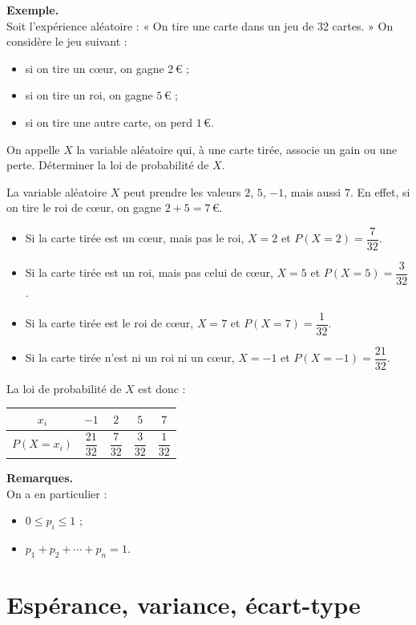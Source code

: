 \documentclass[11pt]{article}
\newenvironment{remarques}{\par\smallskip\noindent\textbf{Remarques. \\}\ignorespaces}{\par\smallskip}
\newenvironment{exemple}{\par\smallskip\noindent\textbf{Exemple. \\}\ignorespaces}{\par\smallskip}
\begin{document}
\begin{exemple}
Soit l'expérience aléatoire : « On tire une carte dans un jeu de 32 cartes. » On considère le jeu suivant :
\begin{itemize}
    \item si on tire un cœur, on gagne $2\,€$ ;
    \item si on tire un roi, on gagne $5\,€$ ;
    \item si on tire une autre carte, on perd $1\,€$.
\end{itemize}
On appelle $X$ la variable aléatoire qui, à une carte tirée, associe un gain ou une perte. Déterminer la loi de probabilité de $X$.

La variable aléatoire $X$ peut prendre les valeurs $2$, $5$, $-1$, mais aussi $7$. En effet, si on tire le roi de cœur, on gagne $2+5=7\,€$.
\begin{itemize}
    \item Si la carte tirée est un cœur, mais pas le roi, $X=2$ et $P(X=2)=\dfrac{7}{32}$.
    \item Si la carte tirée est un roi, mais pas celui de cœur, $X=5$ et $P(X=5)=\dfrac{3}{32}$.
    \item Si la carte tirée est le roi de cœur, $X=7$ et $P(X=7)=\dfrac{1}{32}$.
    \item Si la carte tirée n'est ni un roi ni un cœur, $X=-1$ et $P(X=-1)=\dfrac{21}{32}$.
\end{itemize}
La loi de probabilité de $X$ est donc :
\begin{center}
\renewcommand{\arraystretch}{1.4}
\begin{tabular}{c|cccc}
$x_i$ & $-1$ & $2$ & $5$ & $7$ \\
\hline
$P(X=x_i)$ & $\dfrac{21}{32}$ & $\dfrac{7}{32}$ & $\dfrac{3}{32}$ & $\dfrac{1}{32}$
\end{tabular}
\end{center}
\end{exemple}

\begin{remarques}
On a en particulier :
\begin{itemize}
    \item $0\leq p_i\leq 1$ ;
    \item $p_1+p_2+\cdots+p_n=1$.
\end{itemize}
\end{remarques}

\section{Espérance, variance, écart-type}
\end{document}
